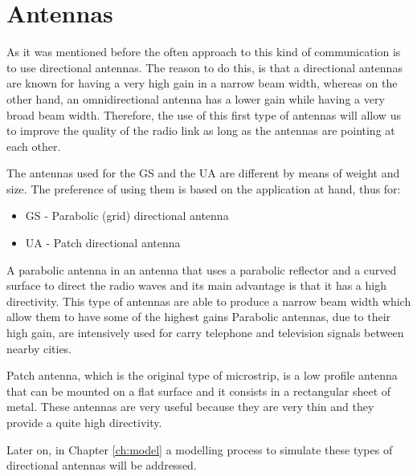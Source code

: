 \section{Antennas}\label{sec:antennas}

As it was mentioned before the often approach to this kind of communication is to use directional antennas.
The reason to do this, is that a directional antennas are known for having a very high gain in a narrow beam width, whereas on the other hand, an omnidirectional antenna has a lower gain while having a very broad beam width.
Therefore, the use of this first type of antennas will allow us to improve the quality of the radio link as long as the antennas are pointing at each other.

The antennas used for the GS and the UA are different by means of weight and size. The preference of using them is based on the application at hand, thus for:
\begin{itemize}
	\item GS - Parabolic (grid) directional antenna 
	\item UA - Patch directional antenna
\end{itemize}

A parabolic antenna in an antenna that uses a parabolic reflector and a curved surface to direct the radio waves and its main advantage is that it has a high directivity. This type of antennas are able to produce a narrow beam width which allow them to have some of the highest gains Parabolic antennas, due to their high gain, are intensively used for carry telephone and television signals between nearby cities.

Patch antenna, which is the original type of microstrip, is a low profile antenna that can be mounted on a flat surface and it consists in a rectangular sheet of metal. These antennas are very useful because they are very thin and they provide a quite high directivity.

Later on, in Chapter \ref{ch:model} a modelling process to simulate these types of directional antennas will be addressed.